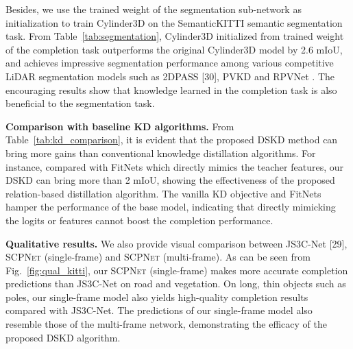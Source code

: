 \documentclass[10pt,twocolumn,letterpaper]{article}
\newcommand{\methodname}{\textsc{SCPNet}}
\begin{document}
Besides, we use the trained weight of the segmentation sub-network as initialization to train Cylinder3D on the SemanticKITTI semantic segmentation task. From Table~\ref{tab:segmentation}, Cylinder3D initialized from trained weight of the completion task outperforms the original Cylinder3D model by 2.6 mIoU, and achieves impressive segmentation performance among various competitive LiDAR segmentation models such as 2DPASS [30], PVKD \cite{luisroldao2018} and RPVNet \cite{ref0a}. The encouraging results show that knowledge learned in the completion task is also beneficial to the segmentation task.

\textbf{Comparison with baseline KD algorithms.}
From Table~\ref{tab:kd_comparison}, it is evident that the proposed DSKD method can bring more gains than conventional knowledge distillation algorithms. For instance, compared with FitNets \cite{yuenanhou2020} which directly mimics the teacher features, our DSKD can bring more than 2 mIoU, showing the effectiveness of the proposed relation-based distillation algorithm. The vanilla KD objective and FitNets hamper the performance of the base model, indicating that directly mimicking the logits or features cannot boost the completion performance.

\textbf{Qualitative results.}
We also provide visual comparison between JS3C-Net [29], \methodname{} (single-frame) and \methodname{} (multi-frame). As can be seen from Fig.~\ref{fig:qual_kitti}, our \methodname{} (single-frame) makes more accurate completion predictions than JS3C-Net on road and vegetation. On long, thin objects such as poles, our single-frame model also yields high-quality completion results compared with JS3C-Net. The predictions of our single-frame model also resemble those of the multi-frame network, demonstrating the efficacy of the proposed DSKD algorithm.
\end{document}
